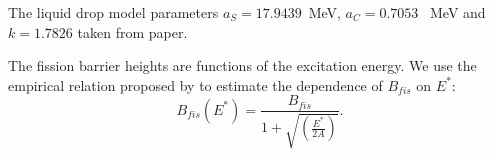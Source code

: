 The liquid drop model parameters $a_S = 17.9439$\ MeV, $a_C=0.7053$ \ MeV 
and $k = 1.7826$ taken from \cite{CS63} paper.

The fission barrier heights are functions of the excitation energy. We use the 
empirical relation proposed by \cite{Barash73} to estimate the dependence of 
$B_{fis}$ on $E^{*}$:
\begin{equation}
\label{FP8} B_{fis}(E^{*}) =\frac{B_{fis}}{1+\sqrt{(\frac{E^{*}}{2A})}}.
\end{equation} 
